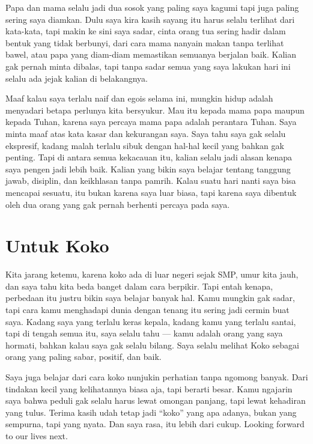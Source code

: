 \documentclass[
  letterpaper,
  DIV=11,
  numbers=noendperiod]{scrreprt}
\begin{document}
Papa dan mama selalu jadi dua sosok yang paling saya kagumi tapi juga
paling sering saya diamkan. Dulu saya kira kasih sayang itu harus selalu
terlihat dari kata-kata, tapi makin ke sini saya sadar, cinta orang tua
sering hadir dalam bentuk yang tidak berbunyi, dari cara mama nanyain
makan tanpa terlihat bawel, atau papa yang diam-diam memastikan semuanya
berjalan baik. Kalian gak pernah minta dibalas, tapi tanpa sadar semua
yang saya lakukan hari ini selalu ada jejak kalian di belakangnya.

Maaf kalau saya terlalu naif dan egois selama ini, mungkin hidup adalah
menyadari betapa perlunya kita bersyukur. Mau itu kepada mama papa
maupun kepada Tuhan, karena saya percaya mama papa adalah perantara
Tuhan. Saya minta maaf atas kata kasar dan kekurangan saya. Saya tahu
saya gak selalu ekspresif, kadang malah terlalu sibuk dengan hal-hal
kecil yang bahkan gak penting. Tapi di antara semua kekacauan itu,
kalian selalu jadi alasan kenapa saya pengen jadi lebih baik. Kalian
yang bikin saya belajar tentang tanggung jawab, disiplin, dan keikhlasan
tanpa pamrih. Kalau suatu hari nanti saya bisa mencapai sesuatu, itu
bukan karena saya luar biasa, tapi karena saya dibentuk oleh dua orang
yang gak pernah berhenti percaya pada saya.

\section{Untuk Koko}\label{untuk-koko}

Kita jarang ketemu, karena koko ada di luar negeri sejak SMP, umur kita
jauh, dan saya tahu kita beda banget dalam cara berpikir. Tapi entah
kenapa, perbedaan itu justru bikin saya belajar banyak hal. Kamu mungkin
gak sadar, tapi cara kamu menghadapi dunia dengan tenang itu sering jadi
cermin buat saya. Kadang saya yang terlalu keras kepala, kadang kamu
yang terlalu santai, tapi di tengah semua itu, saya selalu tahu --- kamu
adalah orang yang saya hormati, bahkan kalau saya gak selalu bilang.
Saya selalu melihat Koko sebagai orang yang paling sabar, positif, dan
baik.

Saya juga belajar dari cara koko nunjukin perhatian tanpa ngomong
banyak. Dari tindakan kecil yang kelihatannya biasa aja, tapi berarti
besar. Kamu ngajarin saya bahwa peduli gak selalu harus lewat omongan
panjang, tapi lewat kehadiran yang tulus. Terima kasih udah tetap jadi
``koko'' yang apa adanya, bukan yang sempurna, tapi yang nyata. Dan saya
rasa, itu lebih dari cukup. Looking forward to our lives next.
\end{document}

